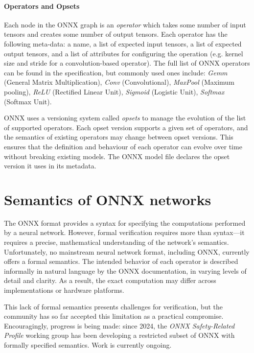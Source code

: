 \paragraph{Operators and Opsets}

Each node in the ONNX graph is an \emph{operator} which takes some number of input tensors and creates some number of output tensors. Each operator has the following meta-data: a name, a list of expected input tensors, a list of expected output tensors, and a list of attributes for configuring the operation (e.g. kernel size and stride for a convolution-based operator). The full list of ONNX operators can be found in the specification, but commonly used ones include: 
\textit{Gemm} (General Matrix Multiplication), \textit{Conv} (Convolutional), \textit{MaxPool} (Maximum pooling), 	\textit{ReLU} (Rectified Linear Unit), \textit{Sigmoid} (Logistic Unit), \textit{Softmax} (Softmax Unit).

ONNX uses a versioning system called \emph{opsets} to manage the evolution of the list of supported operators. Each opset version supports a given set of operators, and the semantics of existing operators may change between opset versions.
This ensures that the definition and behaviour of each operator can evolve over time without breaking existing models. The ONNX model file declares the opset version it uses in its metadata.

\section{Semantics of ONNX networks}

The ONNX format provides a syntax for specifying the computations performed by a neural network. However, formal verification requires more than syntax—it requires a precise, mathematical understanding of the network’s semantics. Unfortunately, no mainstream neural network format, including ONNX, currently offers a formal semantics. The intended behavior of each operator is described informally in natural language by the ONNX documentation, in varying levels of detail and clarity. As a result, the exact computation may differ across implementations or hardware platforms.

This lack of formal semantics presents challenges for verification, but the community has so far accepted this limitation as a practical compromise. Encouragingly, progress is being made: since 2024, the \emph{ONNX Safety-Related Profile} working group has been developing a restricted subset of ONNX with formally specified semantics. Work is currently ongoing.

